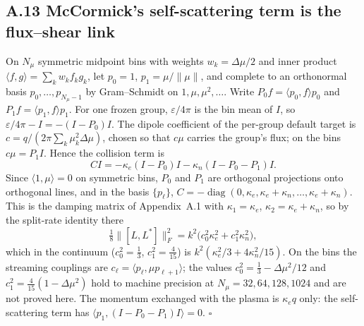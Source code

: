 \subsection*{A.13 McCormick's self-scattering term is the flux--shear link}
On $N_\mu$ symmetric midpoint bins with weights $w_k=\Delta\mu/2$ and inner product $\langle f,g\rangle=\sum_kw_kf_kg_k$, let $p_0=1$, $p_1=\mu/\lVert\mu\rVert$, and complete to an orthonormal basis $p_0,\dots,p_{N_\mu-1}$ by Gram--Schmidt on $1,\mu,\mu^2,\dots$. Write $P_0f=\langle p_0,f\rangle p_0$ and $P_1f=\langle p_1,f\rangle p_1$. For one frozen group, $\varepsilon/4\pi$ is the bin mean of $I$, so $\varepsilon/4\pi-I=-(I-P_0)I$. The dipole coefficient of the per-group default target is $c=q/(2\pi\sum_k\mu_k^2\Delta\mu)$, chosen so that $c\mu$ carries the group's flux; on the bins $c\mu=P_1I$. Hence the collision term is
\[C I=-\kappa_e(I-P_0)I-\kappa_n(I-P_0-P_1)I .\]
Since $\langle1,\mu\rangle=0$ on symmetric bins, $P_0$ and $P_1$ are orthogonal projections onto orthogonal lines, and in the basis $\{p_\ell\}$, $C=-\operatorname{diag}(0,\kappa_e,\kappa_e+\kappa_n,\dots,\kappa_e+\kappa_n)$. This is the damping matrix of Appendix~A.1 with $\kappa_1=\kappa_e$, $\kappa_2=\kappa_e+\kappa_n$, so by the split-rate identity there
\[\tfrac18\lVert[L,L^\ast]\rVert_F^2=k^2\bigl(c_0^2\kappa_e^2+c_1^2\kappa_n^2\bigr),\]
which in the continuum ($c_0^2=\tfrac13$, $c_1^2=\tfrac4{15}$) is $k^2(\kappa_e^2/3+4\kappa_n^2/15)$. On the bins the streaming couplings are $c_\ell=\langle p_\ell,\mu p_{\ell+1}\rangle$; the values $c_0^2=\tfrac13-\Delta\mu^2/12$ and $c_1^2=\tfrac4{15}(1-\Delta\mu^2)$ hold to machine precision at $N_\mu=32,64,128,1024$ and are not proved here. The momentum exchanged with the plasma is $\kappa_eq$ only: the self-scattering term has $\langle p_1,(I-P_0-P_1)I\rangle=0$. $\square$

